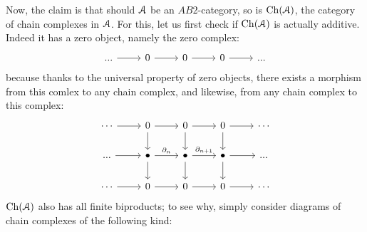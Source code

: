 \begin{example}
                        Now, the claim is that should $\mathcal{A}$ be an $AB2$-category, so is $\mathrm{Ch}(\mathcal{A})$, the category of chain complexes in $\mathcal{A}$. For this, let us first check if $\mathrm{Ch}(\mathcal{A})$ is actually additive. Indeed it has a zero object, namely the zero complex:
                            $$
                                \begin{tikzcd}
                                	{...} & 0 & 0 & 0 & {...}
                                	\arrow[from=1-1, to=1-2]
                                	\arrow[from=1-2, to=1-3]
                                	\arrow[from=1-3, to=1-4]
                                	\arrow[from=1-4, to=1-5]
                                \end{tikzcd}
                            $$
                        because thanks to the universal property of zero objects, there exists a morphism from this comlex to any chain complex, and likewise, from any chain complex to this complex:
                            $$
                                \begin{tikzcd}
                                	\cdots & 0 & 0 & 0 & \cdots \\
                                	{...} & \bullet & \bullet & \bullet & {...} \\
                                	\cdots & 0 & 0 & 0 & \cdots
                                	\arrow[from=2-1, to=2-2]
                                	\arrow["{\del_n}", from=2-2, to=2-3]
                                	\arrow["{\del_{n + 1}}", from=2-3, to=2-4]
                                	\arrow[from=2-4, to=2-5]
                                	\arrow[from=1-2, to=2-2]
                                	\arrow[from=2-2, to=3-2]
                                	\arrow[from=1-3, to=2-3]
                                	\arrow[from=2-3, to=3-3]
                                	\arrow[from=1-4, to=2-4]
                                	\arrow[from=2-4, to=3-4]
                                	\arrow[from=1-2, to=1-3]
                                	\arrow[from=1-3, to=1-4]
                                	\arrow[from=3-2, to=3-3]
                                	\arrow[from=3-3, to=3-4]
                                	\arrow[from=1-1, to=1-2]
                                	\arrow[from=1-4, to=1-5]
                                	\arrow[from=3-1, to=3-2]
                                	\arrow[from=3-4, to=3-5]
                                \end{tikzcd}
                            $$
                        $\mathrm{Ch}(\mathcal{A})$ also has all finite biproducts; to see why, simply consider diagrams of chain complexes of the following kind:

\end{example}
